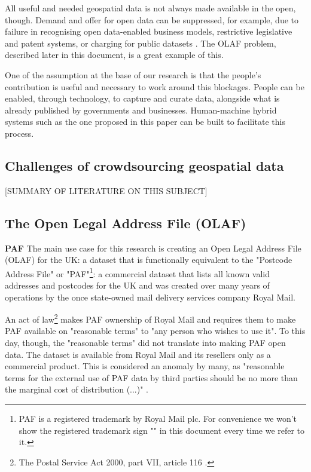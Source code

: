 All useful and needed geospatial data is not always made available in the open, though. Demand and offer for open data can be suppressed, for example, due to failure in recognising open data-enabled business models, restrictive legislative and patent systems, or charging for public datasets \cite{shadboltpaf}. The OLAF problem, described later in this document, is a great example of this.
	
One of the assumption at the base of our research is that the people's contribution is useful and necessary to work around this blockages. People can be enabled, through technology, to capture and curate data, alongside what is already published by governments and businesses. Human-machine hybrid systems such as the one proposed in this paper can be built to facilitate this process.

\subsection{Challenges of crowdsourcing geospatial data}

[SUMMARY OF LITERATURE ON THIS SUBJECT]

\subsection{The Open Legal Address File (OLAF)}
\label{subs:the-problem-of-creating-an-olaf}

\textbf{PAF} The main use case for this research is creating an Open Legal Address File (OLAF) for the UK: a dataset that is functionally equivalent to the "Postcode Address File" or "PAF"\footnote{PAF is a registered trademark by Royal Mail plc. For convenience we won't show the registered trademark sign "\textregistered" in this document every time we refer to it.}: a commercial dataset that lists all known valid addresses and postcodes for the UK and was created over many years of operations by the once state-owned mail delivery services company Royal Mail.

An act of law\footnote{The Postal Service Act 2000, part VII, article 116 \cite{postalserviceact2000}.} makes PAF ownership of Royal Mail and requires them to make PAF available on "reasonable terms" to "any person who wishes to use it". To this day, though, the "reasonable terms" did not translate into making PAF open data. The dataset is available from Royal Mail and its resellers only as a commercial product. This is considered an anomaly by many, as "reasonable terms for the external use of PAF data by third parties should be no more than the marginal cost of distribution (...)" \cite{odugresponse}. 

